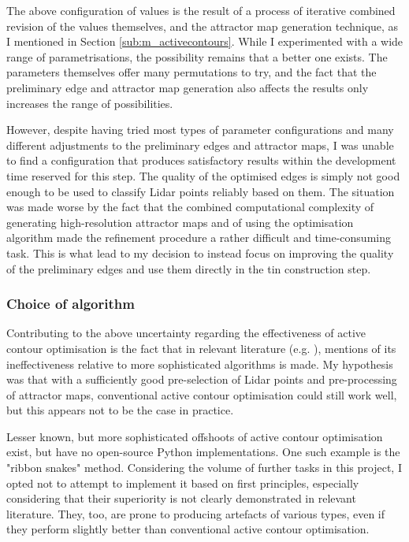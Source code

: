 The above configuration of values is the result of a process of iterative combined revision of the values themselves, and the attractor map generation technique, as I mentioned in Section \ref{sub:m_activecontours}. While I experimented with a wide range of parametrisations, the possibility remains that a better one exists. The parameters themselves offer many permutations to try, and the fact that the preliminary edge and attractor map generation also affects the results only increases the range of possibilities.  

However, despite having tried most types of parameter configurations and many different adjustments to the preliminary edges and attractor maps, I was unable to find a configuration that produces satisfactory results within the development time reserved for this step. The quality of the optimised edges is simply not good enough to be used to classify Lidar points reliably based on them. The situation was made worse by the fact that the combined computational complexity of generating high-resolution attractor maps and of using the optimisation algorithm made the refinement procedure a rather difficult and time-consuming task. This is what lead to my decision to instead focus on improving the quality of the preliminary edges and use them directly in the \ac{tin} construction step. 

\subsubsection{Choice of algorithm}

Contributing to the above uncertainty regarding the effectiveness of active contour optimisation is the fact that in relevant literature (e.g. \cite{boyko_funkhauser_2011}), mentions of its ineffectiveness relative to more sophisticated algorithms is made. My hypothesis was that with a sufficiently good pre-selection of Lidar points and pre-processing of attractor maps, conventional active contour optimisation could still work well, but this appears not to be the case in practice.

Lesser known, but more sophisticated offshoots of active contour optimisation exist, but have no open-source Python implementations. One such example is the "ribbon snakes" method. Considering the volume of further tasks in this project, I opted not to attempt to implement it based on first principles, especially considering that their superiority is not clearly demonstrated in relevant literature. They, too, are prone to producing artefacts of various types, even if they perform slightly better than conventional active contour optimisation.

